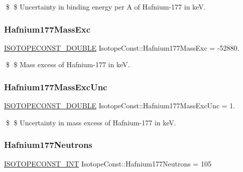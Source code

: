 \$ \$ Uncertainty in binding energy per A of Hafnium-\/177 in keV. \mbox{\label{group___isotope_const-_hafnium-_hf177_gaa566d89b7a1cfa4e40d5d165f8533bf5}} 
\subsubsection{\texorpdfstring{Hafnium177\+Mass\+Exc}{Hafnium177MassExc}}
{\footnotesize\ttfamily \mbox{\hyperlink{group___isotope_const-_macros_ga8f45a7272ce02c0b4c65c44636ed719a}{I\+S\+O\+T\+O\+P\+E\+C\+O\+N\+S\+T\+\_\+\+D\+O\+U\+B\+LE}} Isotope\+Const\+::\+Hafnium177\+Mass\+Exc = -\/52880.}

\$ \$ Mass excess of Hafnium-\/177 in keV. \mbox{\label{group___isotope_const-_hafnium-_hf177_gada9ab77f589a5ef82868d78a850202f7}} 
\subsubsection{\texorpdfstring{Hafnium177\+Mass\+Exc\+Unc}{Hafnium177MassExcUnc}}
{\footnotesize\ttfamily \mbox{\hyperlink{group___isotope_const-_macros_ga8f45a7272ce02c0b4c65c44636ed719a}{I\+S\+O\+T\+O\+P\+E\+C\+O\+N\+S\+T\+\_\+\+D\+O\+U\+B\+LE}} Isotope\+Const\+::\+Hafnium177\+Mass\+Exc\+Unc = 1.}

\$ \$ Uncertainty in mass excess of Hafnium-\/177 in keV. \mbox{\label{group___isotope_const-_hafnium-_hf177_ga20fb6a6a4cd2b4cd387369305aeaa1da}} 
\subsubsection{\texorpdfstring{Hafnium177\+Neutrons}{Hafnium177Neutrons}}
{\footnotesize\ttfamily \mbox{\hyperlink{group___isotope_const-_macros_ga5f18360b3e99483a35c32d789e62621c}{I\+S\+O\+T\+O\+P\+E\+C\+O\+N\+S\+T\+\_\+\+I\+NT}} Isotope\+Const\+::\+Hafnium177\+Neutrons = 105}

